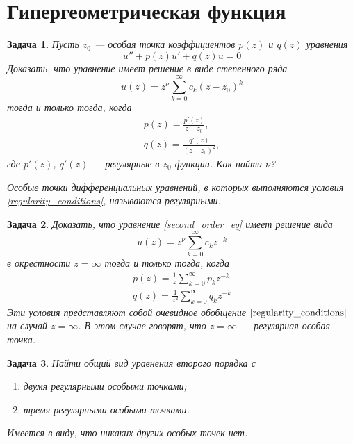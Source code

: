 \documentclass{article}
\newtheorem{problem}{Задача}
\begin{document}
\section{Гипергеометрическая функция}
\begin{problem}
    Пусть $z_0$ --- особая точка коэффициентов $p(z)$ и $q(z)$ уравнения
    \begin{equation}
        \label{second_order_eq}
        u'' + p(z)u' + q(z)u = 0
    \end{equation}
    Доказать, что уравнение имеет решение в виде степенного ряда 
    \begin{equation}
        u(z) = z^{\nu}\sum_{k=0}^{\infty} c_k (z - z_0)^k 
    \end{equation}
    тогда и только тогда, когда 
    \begin{equation}
        \label{regularity_conditions}
        \begin{gathered}
            p(z) = \frac{p'(z)}{z - z_0},\\
            q(z) = \frac{q'(z)}{(z - z_0)^2},
        \end{gathered}
    \end{equation}
    где $p'(z)$, $q'(z)$ --- регулярные в $z_0$ функции. Как найти $\nu$?

    Особые точки дифференциальных уравнений, в которых выполняются условия 
    \eqref{regularity_conditions}, называются
    \emph{регулярными}.
\end{problem}   
\begin{problem}
    Доказать, что уравнение \eqref{second_order_eq} имеет решение вида
    \begin{equation}
        u(z) = z^{\nu}\sum_{k=0}^{\infty} c_k z^{-k}
    \end{equation}
    в окрестности $z = \infty$ тогда и только тогда, когда
    \begin{equation}
        \label{regularity_conditions_on_inf}
        \begin{gathered}
            p(z) = \frac{1}{z}\sum_{k=0}^{\infty} p_k z^{-k}\\
            q(z) = \frac{1}{z^2}\sum_{k=0}^{\infty} q_k z^{-k}
        \end{gathered}
    \end{equation}
    Эти условия представляют собой очевидное обобщение $\eqref{regularity_conditions}$ на
    случай $z = \infty$. В этом случае говорят, что $z = \infty$ --- регулярная особая точка.
\end{problem}
\begin{problem}
    Найти общий вид уравнения второго порядка с
    \begin{enumerate}
        \item двумя регулярными особыми точками;
        \item тремя регулярными особыми точками.
    \end{enumerate}
    Имеется в виду, что никаких других особых точек нет.
\end{problem}
\end{document}
